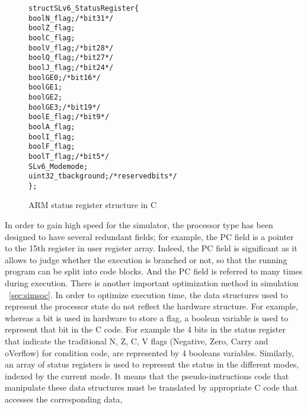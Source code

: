 \begin{figure}
\begin{alltt}
struct SLv6_StatusRegister \{
  bool N_flag; /* bit 31 */
  bool Z_flag;
  bool C_flag;
  bool V_flag; /* bit 28 */
  bool Q_flag; /* bit 27 */
  bool J_flag; /* bit 24 */
  bool GE0; /* bit 16 */
  bool GE1;
  bool GE2;
  bool GE3; /* bit 19 */
  bool E_flag; /* bit 9 */
  bool A_flag;
  bool I_flag;
  bool F_flag;
  bool T_flag; /* bit 5 */
  SLv6_Mode mode;
  uint32_t background; /* reserved bits */
\};
\end{alltt}
\caption{ARM status register structure in C}
\label{fig:stregc}
\end{figure}

In order to gain high speed for the simulator,
the processor type has been designed to have
several redundant fields; for example, the PC field is a pointer
to the 15th register in user register array.
Indeed, the PC field is significant as it allows
to judge whether the execution is branched or not,
so that the running program can be split into code blocks.
And the PC field is referred to many times during execution.
There is another important optimization method
in \simsoc simulation ~\ref{sec:simsoc}.
In order to optimize execution time, the data structures used to
represent the processor state do not reflect the hardware structure.
For example, whereas a bit is used in hardware to store a flag,
a boolean variable is used to represent that bit in the C code.
For example the 4 bits in the status register that indicate the traditional
N, Z, C, V flags (Negative, Zero, Carry and oVerflow) for condition code,
are represented by 4 booleans variables.
Similarly, an array of status registers is used to represent the
status in the different modes, indexed by the current mode.
It means that the pseudo-instructions code that manipulate these data
structures must be translated by appropriate C code that accesses the
corresponding data,

